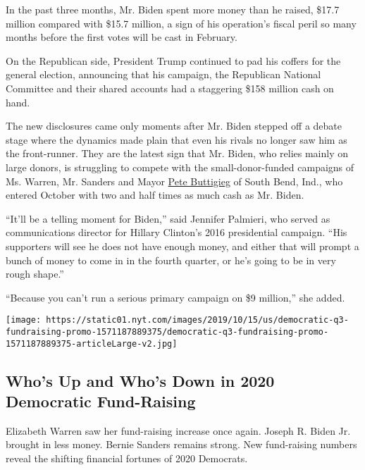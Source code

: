 In the past three months, Mr. Biden spent more money than he raised,
\$17.7 million compared with \$15.7 million, a sign of his operation's
fiscal peril so many months before the first votes will be cast in
February.

On the Republican side, President Trump continued to pad his coffers for
the general election, announcing that his campaign, the Republican
National Committee and their shared accounts had a staggering \$158
million cash on hand.

The new disclosures came only moments after Mr. Biden stepped off a
debate stage where the dynamics made plain that even his rivals no
longer saw him as the front-runner. They are the latest sign that Mr.
Biden, who relies mainly on large donors, is struggling to compete with
the small-donor-funded campaigns of Ms. Warren, Mr. Sanders and Mayor
\href{https://www.nytimes.com/interactive/2020/us/elections/pete-buttigieg.html}{Pete
Buttigieg} of South Bend, Ind., who entered October with two and half
times as much cash as Mr. Biden.

``It'll be a telling moment for Biden,'' said Jennifer Palmieri, who
served as communications director for Hillary Clinton's 2016
presidential campaign. ``His supporters will see he does not have enough
money, and either that will prompt a bunch of money to come in in the
fourth quarter, or he's going to be in very rough shape.''

``Because you can't run a serious primary campaign on \$9 million,'' she
added.

\href{https://www.nytimes.com/interactive/2019/10/16/us/elections/democratic-q3-fundraising.html}{}

\texttt{[image: https://static01.nyt.com/images/2019/10/15/us/democratic-q3-fundraising-promo-1571187889375/democratic-q3-fundraising-promo-1571187889375-articleLarge-v2.jpg]}

\hypertarget{whos-up-and-whos-down-in-2020-democratic-fund-raising}{%
\subsection{Who's Up and Who's Down in 2020 Democratic
Fund-Raising}\label{whos-up-and-whos-down-in-2020-democratic-fund-raising}}

Elizabeth Warren saw her fund-raising increase once again. Joseph R.
Biden Jr. brought in less money. Bernie Sanders remains strong. New
fund-raising numbers reveal the shifting financial fortunes of 2020
Democrats.

